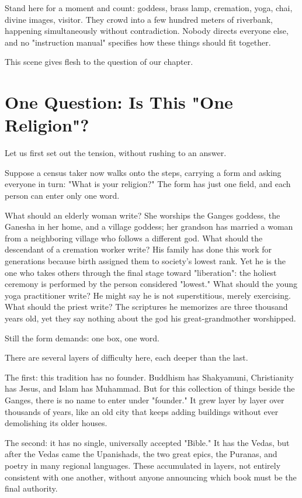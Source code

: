 Stand here for a moment and count: goddess, brass lamp, cremation, yoga, chai, divine images, visitor. They crowd into a few hundred meters of riverbank, happening simultaneously without contradiction. Nobody directs everyone else, and no "instruction manual" specifies how these things should fit together.

This scene gives flesh to the question of our chapter.

\section{One Question: Is This "One Religion"?}
Let us first set out the tension, without rushing to an answer.

Suppose a census taker now walks onto the steps, carrying a form and asking everyone in turn: "What is your religion?" The form has just one field, and each person can enter only one word.

What should an elderly woman write? She worships the Ganges goddess, the Ganesha in her home, and a village goddess; her grandson has married a woman from a neighboring village who follows a different god. What should the descendant of a cremation worker write? His family has done this work for generations because birth assigned them to society's lowest rank. Yet he is the one who takes others through the final stage toward "liberation": the holiest ceremony is performed by the person considered "lowest." What should the young yoga practitioner write? He might say he is not superstitious, merely exercising. What should the priest write? The scriptures he memorizes are three thousand years old, yet they say nothing about the god his great-grandmother worshipped.

Still the form demands: one box, one word.

There are several layers of difficulty here, each deeper than the last.

The first: this tradition has no founder. Buddhism has Shakyamuni, Christianity has Jesus, and Islam has Muhammad. But for this collection of things beside the Ganges, there is no name to enter under "founder." It grew layer by layer over thousands of years, like an old city that keeps adding buildings without ever demolishing its older houses.

The second: it has no single, universally accepted "Bible." It has the Vedas, but after the Vedas came the Upanishads, the two great epics, the Puranas, and poetry in many regional languages. These accumulated in layers, not entirely consistent with one another, without anyone announcing which book must be the final authority.

